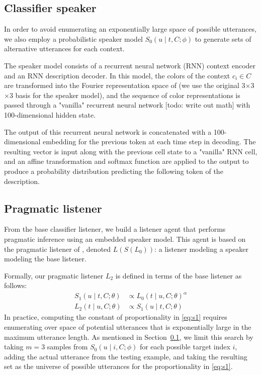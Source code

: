 \documentclass[11pt,letterpaper]{article}
\newcommand{\Listener}{L}
\newcommand{\Speaker}{S}
\newcommand{\utt}{u}
\newcommand{\referent}{c}
\newcommand{\context}{C}
\newcommand{\target}{t}
\newcommand{\numsamples}{m}
\renewcommand{\|}{\mid}
\newcommand{\secref}[1]{Section~\ref{#1}}
\begin{document}
\subsection{Classifier speaker}\label{sec:s0}

In order to avoid enumerating an exponentially large space of possible utterances,
we also employ a probabilistic speaker model
$\Speaker_0(\utt \| \target, \context; \phi)$ to generate sets of alternative
utterances for each context.

The speaker model consists of a recurrent neural network (RNN) context encoder
and an RNN description decoder. In this model, the colors of the context
$\referent_i \in \context$ are transformed into the Fourier representation space
of  (we use the original 3$\times$3$\times$3
basis for the speaker model), and the sequence of color
representations is passed through a "vanilla" recurrent neural network
[todo: write out math] with 100-dimensional hidden state.

The output of this recurrent neural network is concatenated with a
100-dimensional embedding for the previous token at each time step in decoding.
The resulting vector is input along with the previous cell state to a "vanilla" RNN
cell, and an affine transformation and softmax function are applied to the output to
produce a probability distribution predicting the following token of the description.

\subsection{Pragmatic listener}

From the base classifier listener, we build a listener agent that performs
pragmatic inference using an embedded speaker model. This agent is based on the
pragmatic listener of , denoted
$\Listener(\Speaker(\Listener_0))$: a listener modeling a speaker modeling the
base listener.

Formally, our pragmatic listener $\Listener_2$ is defined in terms of the base
listener as follows:
\begin{align}
\Speaker_1(\utt \| \target, \context; \theta) &\propto \Listener_0(\target \| \utt, \context; \theta)^\alpha \label{eq:s1} \\
\Listener_2(\target \| \utt, \context; \theta) &\propto \Speaker_1(\utt \| \target, \context; \theta) \nonumber
\end{align}
In practice, computing the constant of proportionality in \eqref{eq:s1} requires
enumerating over space of potential utterances that is exponentially large in the
maximum utterance length. As mentioned in \secref{sec:s0}, we limit this search by
taking $\numsamples = 3$ samples from $\Speaker_0(\utt \| i, \context; \phi)$ for
each possible target index $i$, adding the actual utterance from the testing example,
and taking the resulting set as the universe of possible utterances for the
proportionality in \eqref{eq:s1}.
\end{document}
